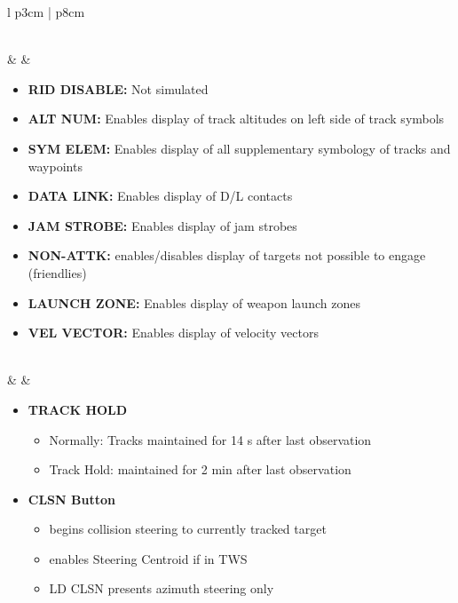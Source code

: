 \documentclass[8pt,usenames,dvipsnames,twoside]{article}
\begin{document}
\begin{center}
\begin{longtable}{l p{3cm} | p{8cm}}
\begin{minipage}[t]{\linewidth}
\begin{itemize}
					\end{itemize}
				\end{minipage} \\
				\midrule
				\textbullet &    & 
				\begin{minipage}[t]{\linewidth}
					\vspace{-7pt}
					\begin{itemize}
						\item \textbf{RID DISABLE:} Not simulated
						\item \textbf{ALT NUM:} Enables display of track altitudes on left side of track symbols
						\item \textbf{SYM ELEM:} Enables display of all supplementary symbology of tracks and waypoints
						\item \textbf{DATA LINK:} Enables display of D/L contacts
						\item \textbf{JAM STROBE:} Enables display of jam strobes
						\item \textbf{NON-ATTK:} enables/disables display of targets not possible to engage (friendlies)
						\item \textbf{LAUNCH ZONE:} Enables display of weapon launch zones
						\item \textbf{VEL VECTOR:} Enables display of velocity vectors
					\end{itemize}
				\end{minipage} \\
				\midrule
				\textbullet &    & 
				\begin{minipage}[t]{\linewidth}
					\vspace{-7pt}
					\begin{itemize}
						\item \textbf{TRACK HOLD} 
						\begin{itemize}
							\item Normally: Tracks maintained for 14 s after last observation
							\item Track Hold: maintained for 2 min after last observation
						\end{itemize}
						\item \textbf{CLSN Button} 
						\begin{itemize}
							\item begins collision steering to currently tracked target
							\item enables Steering Centroid if in TWS
							\item LD CLSN presents azimuth steering only

\end{itemize}
\end{itemize}
\end{minipage}
\end{longtable}
\end{center}
\end{document}
